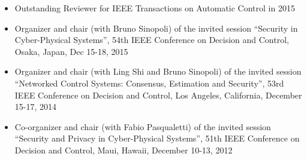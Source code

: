 \documentclass[10pt, a4paper]{article}
\begin{document}
\begin{itemize}
\item Outstanding Reviewer for IEEE Transactions on Automatic Control in 2015

\item Organizer and chair (with Bruno Sinopoli) of the invited session “Security in Cyber-Physical Systems”, 54th IEEE Conference on Decision and Control, Osaka, Japan, Dec 15-18, 2015\\

\item Organizer and chair (with Ling Shi and Bruno Sinopoli) of the invited session “Networked Control Systems: Consensus, Estimation and Security”, 53rd IEEE Conference on Decision and Control, Los Angeles, California, December 15-17, 2014\\
%
\item Co-organizer and chair (with Fabio Pasqualetti) of the invited session ``Security and Privacy in Cyber-Physical Systems'', 51th IEEE Conference on Decision and Control, Maui, Hawaii, December 10-13, 2012\\
%
\end{itemize}






%

\end{document}
